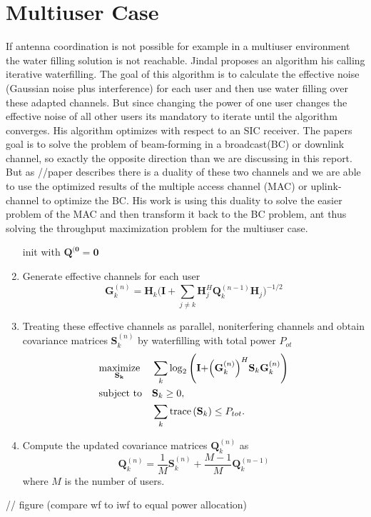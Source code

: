 \section{Multiuser Case}
If antenna coordination is not possible for example in a multiuser environment the water filling solution is not reachable. Jindal proposes an algorithm his calling iterative waterfilling. The goal of this algorithm is to calculate the effective noise (Gaussian noise plus interference) for each user and then use water filling over these adapted channels. But since changing the power of one user changes the effective noise of all other users its mandatory to iterate until the algorithm converges. His algorithm optimizes with respect to an SIC receiver.
The papers goal is to solve the problem of beam-forming in a broadcast(BC) or downlink channel, so exactly the opposite direction than we are discussing in this report. But as //paper describes there is a duality of these two channels and we are able to use the optimized results of the multiple access channel (MAC) or uplink-channel to optimize the BC. His work is using this duality to solve the easier problem of the MAC and then transform it back to the BC problem, ant thus solving the throughput maximization problem for the multiuser case.

\begin{enumerate}
	\item[init] with $\mathbf{Q^{(0}}=\mathbf{0}$
	\item Generate effective channels for each user
		\begin{equation}
			\mathbf{G}_k^{(n)}=\mathbf{H}_k\Biggr(\mathbf{I}+\sum_{j\neq k}{\mathbf{H}_j^H\mathbf{Q}_k^{(n-1)}\mathbf{H}_j}\Biggl)^{-1/2}
		\end{equation}
	\item Treating these effective channels as parallel, noniterfering channels and obtain covariance matrices $\mathbf{S}_k^{(n)}$ by waterfilling with total power $P_{ot}$
		\begin{equation}
			\begin{aligned}
				& \underset{\mathbf{\mathbf{S}_k}}{\text{maximize}}
				& & \sum_k{\log_2{\Biggr(\mathbf{I}+\Bigr(\mathbf{G}_k^{(n)}\Bigl)^H\mathbf{S}_k\mathbf{G}_k^{(n)}\Biggl)}} \\
				& \text{subject to}
				& & \mathbf{S}_k \geq 0,\\
				&&& \sum_k{\text{trace}\left(\mathbf{S}_k\right)}\leq P_{tot}.
			\end{aligned}
		\end{equation}
	\item Compute the updated covariance matrices $\mathbf{Q}_k^{(n)}$ as
		\begin{equation}
			\mathbf{Q}_k^{(n)} = \frac{1}{M}\mathbf{S}_k^{(n)}+\frac{M-1}{M}\mathbf{Q}_k^{(n-1)}
		\end{equation}
	where $M$ is the number of users.
\end{enumerate}


// figure (compare wf to iwf to equal power allocation)